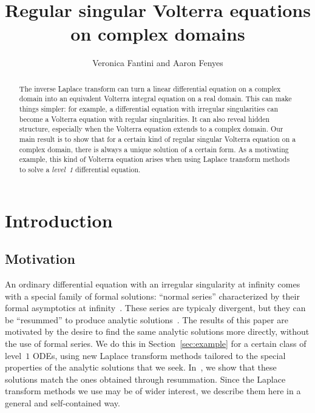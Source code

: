 \documentclass[final]{siamart220329}
\title{Regular singular Volterra equations on complex domains}
\author{Veronica Fantini and Aaron Fenyes}
\date{}
\begin{document}
\maketitle

\begin{abstract}
The inverse Laplace transform can turn a linear differential equation on a complex domain into an equivalent Volterra integral equation on a real domain. This can make things simpler: for example, a differential equation with irregular singularities can become a Volterra equation with regular singularities. It can also reveal hidden structure, especially when the Volterra equation extends to a complex domain. Our main result is to show that for a certain kind of regular singular Volterra equation on a complex domain, there is always a unique solution of a certain form. As a motivating example, this kind of Volterra equation arises when using Laplace transform methods to solve a {\em level~1} differential equation.
\end{abstract}
\tableofcontents
\section{Introduction}\label{sec:intro}
\subsection{Motivation}\label{sec:motivation}
An ordinary differential equation with an irregular singularity at infinity comes with a special family of formal solutions: ``normal series'' characterized by their formal asymptotics at infinity~\cite{int-irreg}. These series are typicaly divergent, but they can be ``resummed'' to produce analytic solutions~\cite{loday1994stokes,diverg-resurg--ii,loday-Remy2011,malgrange1995sommation,ramis1991series}. The results of this paper are motivated by the desire to find the same analytic solutions more directly, without the use of formal series. We do this in Section~\ref{sec:example} for a certain class of level~$1$ ODEs, using new Laplace transform methods tailored to the special properties of the analytic solutions that we seek. In~\cite{borel_reg}, we show that these solutions match the ones obtained through resummation. Since the Laplace transform methods we use may be of wider interest, we describe them here in a general and self-contained way.
\end{document}
